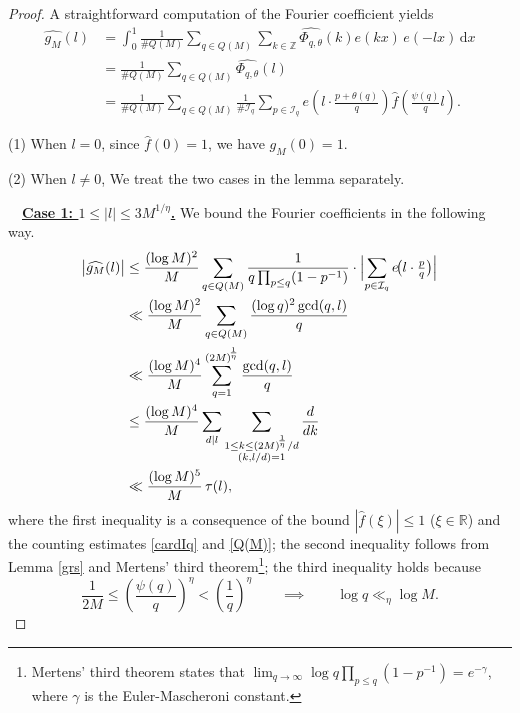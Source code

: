 \documentclass[10pt,a4paper]{amsart}
\begin{document}
\begin{proof} A straightforward computation of the Fourier coefficient yields
\begin{align*}
\widehat{g_M}(l)
&= \int_{0}^{1} \frac{1}{\#Q(M)} \sum_{q\in Q(M)} \sum_{k\in\mathbb{Z}} \widehat{\Phi_{q,\theta}}(k) e(kx) \, e(-lx) \, \mathrm{d}x \\
&= \frac{1}{\#Q(M)} \sum_{q\in Q(M)} \widehat{\Phi_{q,\theta}}(l) \\
&= \frac{1}{\#Q(M)} \sum_{q\in Q(M)} \frac{1}{\#\mathcal{I}_q} \sum_{p\in\mathcal{I}_q} e\!\left(l\cdot\frac{p+\theta(q)}{q}\right) \widehat{f}\!\left(\frac{\psi(q)}{q}l\right).
\end{align*}

\noindent(1) When \(l = 0\), since \(\widehat{f}(0) = 1\), we have \(\widehat{g_M}(0) = 1\).

\smallskip

\noindent(2) When \(l \neq 0\), We treat the two cases in the lemma separately.

\medskip

\noindent{}~~\underline{\textbf{Case 1: $1\le |l|\le 3M^{1/\eta}$.}} We bound the Fourier coefficients in the following way.
\begin{align*}
\bigl|\widehat{g_M}(l)\bigr|
&\le \frac{(\log M)^2}{M} \sum_{q\in Q(M)} \frac{1}{q\prod_{p\le q}(1-p^{-1})} \cdot \Bigl|\sum_{p\in\mathcal{I}_q} e\!\bigl(l\cdot \tfrac{p}{q}\bigr)\Bigr| \\
&\ll \frac{(\log M)^2}{M} \sum_{q\in Q(M)} \frac{(\log q)^2 \gcd(q,l)}{q} \\
&\ll \frac{(\log M)^4}{M} \sum_{q=1}^{(2M)\!^{\frac{1}{\eta}}} \frac{\gcd(q,l)}{q} \\
&\le \frac{(\log M)^4}{M} \sum_{d\mid l} \sum_{\substack{1\le k\le (2M)\!^{\frac{1}{\eta}}/d \\ (k,l/d)=1}} \frac{d}{dk} \\
&\ll \frac{(\log M)^5}{M} \, \tau(l),
\end{align*}
where the first inequality is a consequence of the bound \(|\widehat{f}(\xi)| \le 1\) (\(\xi \in \mathbb{R}\)) and the counting estimates \eqref{cardIq} and \eqref{Q(M)};
the second inequality follows from Lemma \ref{grs} and Mertens' third theorem\footnote{Mertens' third theorem states that $\lim_{q\to\infty} \log q \prod_{p\le q}(1-p^{-1}) = e^{-\gamma}$, where $\gamma$ is the Euler-Mascheroni constant.}; the third inequality holds because
\[\frac{1}{2M}\le \left(\frac{\psi(q)}{q}\right)^{\eta}< \left(\frac{1}{q}\right)^{\eta} \qquad \implies \qquad \log q \ll_{\eta} \log M.\]


\end{proof}
\end{document}
